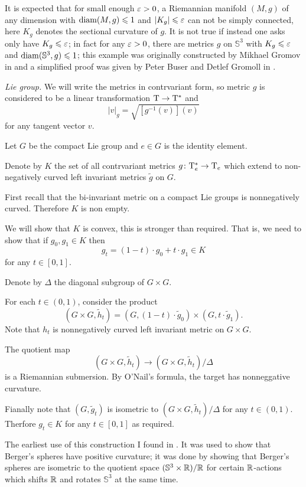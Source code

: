 It is expected that for small enough $\varepsilon>0$,
a Riemannian manifold $(M,g)$ of any dimension 
with  $\operatorname{\rm diam}(M,g)\leqslant 1$ and $|K_g|\leqslant \varepsilon$ can not be simply connected,
here $K_g$ denotes the sectional curvature of $g$.
It is not true if instead one asks only have $K_g\leqslant \varepsilon$;
in fact for any $\varepsilon>0$,
there are metrics $g$ on $\mathbb{S}^3$ 
with $K_g\leqslant \varepsilon$ and $\operatorname{\rm diam}(\mathbb{S}^3,g)\leqslant 1$; 
this example was originally constructed by Mikhael Gromov in \cite{gromov-almost-flat} and a simplified proof was given by 
Peter Buser
and Detlef Gromoll in \cite{buser-gromoll}.


\textit{Lie group.} We will write the metrics in contrvariant form, 
so metric $g$ is considered to be a linear transformation $\mathrm{T}\to \mathrm{T}^*$ and 
\[|v|_g=\sqrt{[g^{-1}(v)](v)}\]
for any tangent vector $v$.


Let $G$ be the compact Lie group and $e\in G$ is the identity element.

Denote by $K$ the set of all contrvariant metrics $g\colon\mathrm{T}^*_e\to \mathrm{T}_e $ 
which extend to non-negatively curved left invariant metrics $\tilde g$ on $G$. 

First recall that the bi-invariant metric on a compact Lie groups is nonnegatively curved. 
Therefore $K$ is non empty.

We will show that $K$ is convex, this is stronger than required.
That is, we need to show that if $g_0, g_1\in K$
then 
\[g_t=(1-t)\cdot g_0+t\cdot g_1\in K\] 
for any $t\in [0,1]$.

Denote by $\Delta$ the diagonal subgroup of $G\times G$.

For each $t\in (0,1)$, consider the product 
\[(G\times G,\tilde h_t)
=
(G,(1-t)\cdot \tilde g_0)\times (G,t\cdot \tilde g_1).\]
Note that $h_t$ is nonnegatively curved left invariant metric on $G\times G$.

The quotient map 
\[
 (G\times G,\tilde h_t)\to (G\times G,\tilde h_t)/\Delta
\]
is a Riemannian submersion.
By O'Nail's formula,
the target has nonneggative curvature.

Fianally note that $(G,\tilde g_t)$
is isometric to
$(G\times G,\tilde h_t)/\Delta$ for any $t\in (0,1)$.
Therfore $g_t\in K$ for any $t\in [0,1]$ as required.

The earliest use of this construction 
I found  in \cite{GKM}.
It was used to show that Berger's spheres have positive curvature;
it was done by showing that
Berger's spheres are isometric to the quotient space $(\mathbb S^3\times \mathbb{R})/\mathbb{R}$ for certain $\mathbb{R}$-actions which shifts $\mathbb{R}$ and rotates $\mathbb{S}^3$ at the same time.

